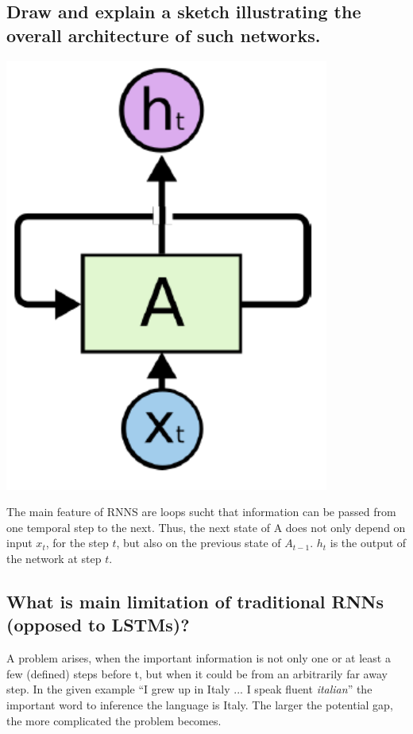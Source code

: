 \subsection{Draw and explain a sketch illustrating the overall  architecture of such networks.}
\begin{minipage}{0.2\textwidth}
\hspace*{0.5cm}\includegraphics[width=0.8\textwidth]{./img/rnn.png}
\end{minipage}
\begin{minipage}{0.8\textwidth}
The main feature of RNNS are loops sucht that information can be passed from one temporal step to the next. Thus, the next state of A does not only depend on input $x_t$, for the step $t$, but also on the previous state of $A_{t-1}$. $h_t$ is the output of the network at step $t$.
\subsection{What is main limitation of traditional RNNs (opposed to LSTMs)?}
A problem arises, when the important information is not only one or at least a few (defined) steps before t, but when it could be from an arbitrarily far away step. In the given example ``I grew up in Italy ... I speak fluent \textit{italian}'' the important word to inference the language is Italy.  The larger the potential gap, the more complicated the problem becomes. 
\end{minipage}
%
